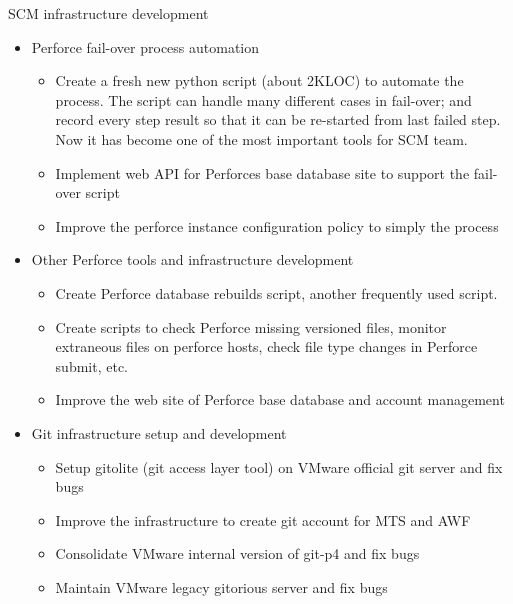 \documentclass[10pt,letterpaper]{article}
\begin{document}
{\headedsubsection %
{SCM infrastructure development} {}
{
    \begin{itemize}
        \item Perforce fail-over process automation
            \begin{itemize}
                \item Create a fresh new python script (about 2KLOC) to automate the process.
                    The script can handle many different cases in fail-over; and record every
                    step result so that it can be re-started from last failed step. Now it has
                    become one of the most important tools for SCM team.
                \item Implement web API for Perforces base database site to support the
                    fail-over script
                \item Improve the perforce instance configuration policy to simply the
                    process
            \end{itemize}
        \item Other Perforce tools and infrastructure development
            \begin{itemize}
                \item   Create Perforce database rebuilds script, another frequently used
                    script.
                \item   Create scripts to check Perforce missing versioned files, monitor
                    extraneous files on perforce hosts, check file type changes in Perforce
                    submit, etc.
                \item   Improve the web site of Perforce base database and account management
            \end{itemize}
        \item Git infrastructure setup and development
            \begin{itemize}
                \item   Setup gitolite (git access layer tool) on VMware official git server
                    and fix bugs
                \item   Improve the infrastructure to create git account for MTS and AWF
                \item   Consolidate VMware internal version of git-p4 and fix bugs
                \item   Maintain VMware legacy gitorious server and fix bugs
            \end{itemize}

\end{itemize}}}
\end{document}
